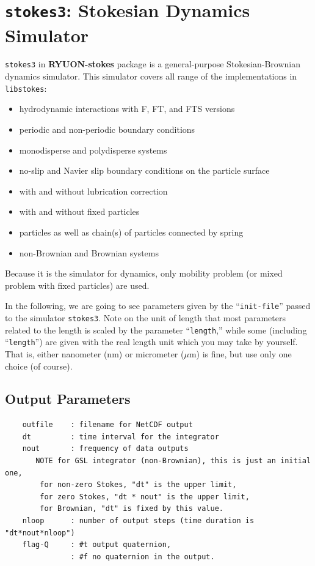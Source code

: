\documentclass{book}
\begin{document}
\section{{\tt stokes3}:
  Stokesian Dynamics Simulator}
{\tt stokes3} in {\bf RYUON-stokes} package is a general-purpose 
Stokesian-Brownian dynamics simulator.
This simulator covers all range of the implementations in {\tt libstokes}:
\begin{itemize}
\item hydrodynamic interactions with F, FT, and FTS versions
\item periodic and non-periodic boundary conditions
\item monodisperse and polydisperse systems
\item no-slip and Navier slip boundary conditions on the particle surface
\item with and without lubrication correction
\item with and without fixed particles
\item particles as well as chain(s) of particles connected by spring
\item non-Brownian and Brownian systems
\end{itemize}
Because it is the simulator for dynamics,
only mobility problem (or mixed problem with fixed particles) are used.

In the following, 
we are going to see parameters given by the ``{\tt init-file}'' 
passed to the simulator {\tt stokes3}. 
Note on the unit of length that 
most parameters related to the length is scaled by 
the parameter ``{\tt length},'' while some (including 
``{\tt length}'') are given with the real length unit 
which you may take by yourself. 
That is, either nanometer (nm) or micrometer ($\mu$m) is fine, 
but use only one choice (of course). 


\subsection{Output Parameters}
{\small
\begin{verbatim}
	outfile    : filename for NetCDF output
	dt         : time interval for the integrator
	nout       : frequency of data outputs
	   NOTE for GSL integrator (non-Brownian), this is just an initial one,
		for non-zero Stokes, "dt" is the upper limit,
		for zero Stokes, "dt * nout" is the upper limit,
		for Brownian, "dt" is fixed by this value.
	nloop      : number of output steps (time duration is "dt*nout*nloop")
	flag-Q     : #t output quaternion,
	           : #f no quaternion in the output.
\end{verbatim}
}
\end{document}
